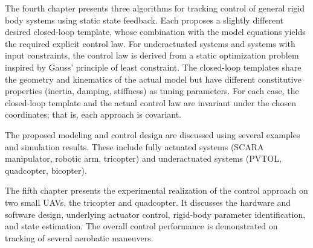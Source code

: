 The fourth chapter presents three algorithms for tracking control of general rigid body systems using static state feedback.
Each proposes a slightly different desired closed-loop template, whose combination with the model equations yields the required explicit control law.
For underactuated systems and systems with input constraints, the control law is derived from a static optimization problem inspired by Gauss' principle of least constraint.
The closed-loop templates share the geometry and kinematics of the actual model but have different constitutive properties (inertia, damping, stiffness) as tuning parameters.
For each case, the closed-loop template and the actual control law are invariant under the chosen coordinates; that is, each approach is covariant.

The proposed modeling and control design are discussed using several examples and simulation results.
These include fully actuated systems (SCARA manipulator, robotic arm, tricopter) and underactuated systems (PVTOL, quadcopter, bicopter).

The fifth chapter presents the experimental realization of the control approach on two small UAVs, the tricopter and quadcopter.
It discusses the hardware and software design, underlying actuator control, rigid-body parameter identification, and state estimation.
The overall control performance is demonstrated on tracking of several aerobatic maneuvers.

